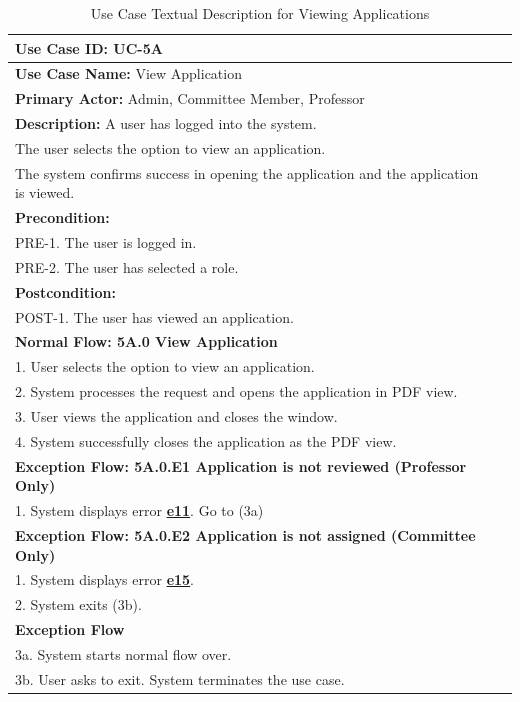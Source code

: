 \documentclass[fontsize=12pt,paper=letter,twoside]{scrartcl}
\begin{document}
\begin{table}[!htb]
\begin{center}
\begin{tabular}{|l|l|}
\hline
\textbf{Use Case ID:} UC-5A \\ \hline
\textbf{Use Case Name:} View Application \\ \hline
\textbf {Primary Actor:} Admin, Committee Member, Professor \\ \hline
\textbf{Description:} A user has logged into the system. \\The user selects the option to view an application. \\The system confirms success in opening the application and the application is viewed.\\ \hline
\textbf{Precondition:}
\\ PRE-1. The user is logged in.
\\ PRE-2. The user has selected a role.\\ \hline
\textbf{Postcondition:}
\\ POST-1. The user has viewed an application. \\ \hline
\textbf{Normal Flow: 5A.0 View Application}
\\ 1. User selects the option to view an application.
\\ 2. System processes the request and opens the application in PDF view.
\\ 3. User views the application and closes the window.
\\ 4. System successfully closes the application as the PDF view.\\ \hline
\textbf{Exception Flow: 5A.0.E1 Application is not reviewed (Professor Only)}
\\ 1. System displays error \hyperref[app:error]{\textbf{e11}}. Go to (3a)
\\ \hline
\textbf{Exception Flow: 5A.0.E2 Application is not assigned (Committee Only)}
\\ 1. System displays error \hyperref[app:error]{\textbf{e15}}.
\\ 2. System exits (3b). \\ \hline
\textbf{Exception Flow}
\\ 3a. System starts normal flow over.
\\ 3b. User asks to exit. System terminates the use case.\\ \hline
\end{tabular}
\end{center}
\caption {Use Case Textual Description for Viewing Applications}
\label{tbl:uc5Atd}
\end{table}
\end{document}
